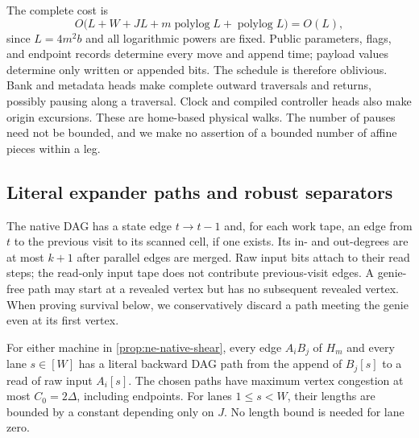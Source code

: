 \begin{informalproof}
The complete cost is
\[
 O\bigl(L+W+JL+m\operatorname{polylog}L+\operatorname{polylog}L\bigr)
 =O(L),
\]
since $L=4m^2b$ and all logarithmic powers are fixed.  Public parameters,
flags, and endpoint records determine every move and append time; payload
values determine only written or appended bits.  The schedule is therefore
oblivious.  Bank and metadata heads make complete outward traversals and
returns, possibly pausing along a traversal.  Clock and compiled controller
heads also make origin excursions.  These are home-based physical walks.
The number of pauses need not be bounded, and we make no assertion of a
bounded number of affine pieces within a leg.
\end{informalproof}

\subsection{Literal expander paths and robust separators}

The native DAG has a state edge $t\to t-1$ and, for each work tape, an
edge from $t$ to the previous visit to its scanned cell, if one exists.
Its in- and out-degrees are at most $k+1$ after parallel edges are merged.
Raw input bits attach to their read steps; the read-only input tape does
not contribute previous-visit edges.  A genie-free path may start at a
revealed vertex but has no subsequent revealed vertex.  When proving
survival below, we conservatively discard a path meeting the genie even
at its first vertex.

\begin{lemma}\label{lem:ne-paths}
\notformalized
For either machine in \cref{prop:ne-native-shear}, every edge
$A_iB_j$ of $H_m$ and every lane $s\in[W]$ has a literal backward DAG
path from the append of $B_j[s]$ to a read of raw input $A_i[s]$.
The chosen paths have maximum vertex congestion at most $C_0=2\Delta$,
including endpoints.  For lanes $1\le s<W$, their lengths are bounded by
a constant depending only on $J$.  No length bound is needed for lane zero.
\end{lemma}

